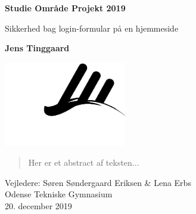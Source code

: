 \begin{titlepage}
   \begin{center}

       \Large
       \textbf{Studie Område Projekt 2019}

        \vspace{0.5cm}
        \large
        Sikkerhed bag login-formular på en hjemmeside

       \vspace{1cm}
       \large
       \textbf{Jens Tinggaard}

       \vspace{1cm}
       {\hspace{-2cm}\includegraphics[width=0.4\textwidth]{img/otg_logo.png}}

       \vspace{-0.5cm}
       \begin{abstract}
           Her er et abstract af teksten...
       \end{abstract}

       \vfill

       Vejledere: Søren Søndergaard Eriksen \& Lena Erbs\\
       Odense Tekniske Gymnasium\\
       20. december 2019
   \end{center}
\end{titlepage}
